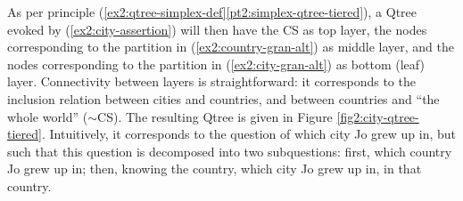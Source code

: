 \begin{exe}
	\label{ex2:country-gran-alt}
\end{exe} 

As per principle (\ref{ex2:qtree-simplex-def}\ref{pt2:simplex-qtree-tiered}), a Qtree evoked by (\ref{ex2:city-assertion}) will then have the CS as top layer, the nodes corresponding to the partition in (\ref{ex2:country-gran-alt}) as middle layer, and the nodes corresponding to the partition in (\ref{ex2:city-gran-alt}) as bottom (leaf) layer. Connectivity between layers is straightforward: it corresponds to the inclusion relation between cities and countries, and between countries and ``the whole world'' ($\sim$CS). The resulting Qtree is given in Figure \ref{fig2:city-qtree-tiered}. Intuitively, it corresponds to the question of which city Jo grew up in, but such that this question is decomposed into two subquestions: first, which country Jo grew up in; then, knowing the country, which city Jo grew up in, in that country.


